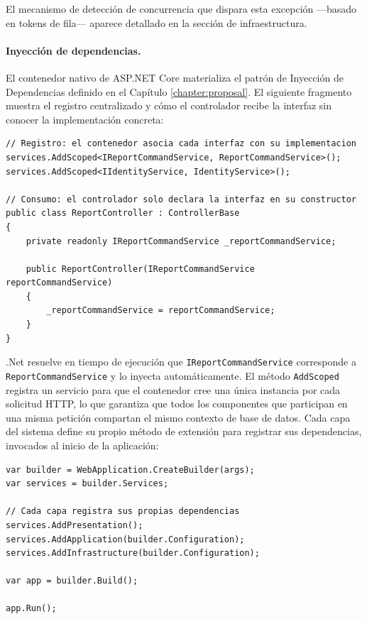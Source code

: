 El mecanismo de detección de concurrencia que dispara esta excepción —basado en tokens de fila— aparece detallado en la sección de infraestructura.



\paragraph{Inyección de dependencias.}

El contenedor nativo de ASP.NET Core materializa el patrón de Inyección de Dependencias definido en el Capítulo \ref{chapter:proposal}.
El siguiente fragmento muestra el registro centralizado y cómo el controlador recibe la interfaz sin conocer la implementación concreta:

\begin{lstlisting}[language={[Sharp]C}, caption={Registro y consumo de dependencias}, label={lst:di_registration}]
// Registro: el contenedor asocia cada interfaz con su implementacion
services.AddScoped<IReportCommandService, ReportCommandService>();
services.AddScoped<IIdentityService, IdentityService>();

// Consumo: el controlador solo declara la interfaz en su constructor
public class ReportController : ControllerBase
{
    private readonly IReportCommandService _reportCommandService;

    public ReportController(IReportCommandService reportCommandService)
    {
        _reportCommandService = reportCommandService;
    }
}
\end{lstlisting}

.Net resuelve en tiempo de ejecución que \texttt{IReportCommandService} corresponde a \texttt{ReportCommandService} y lo inyecta automáticamente.
El método \texttt{AddScoped} registra un servicio para que el contenedor cree una única instancia por cada solicitud HTTP, lo que garantiza que todos los componentes que participan en una misma petición compartan el mismo contexto de base de datos. 
Cada capa del sistema define su propio método de extensión para registrar sus dependencias, invocados al inicio de la aplicación:

\begin{lstlisting}[language={[Sharp]C}, caption={Invocación de los métodos de registro en Program.cs}, label={lst:program}]
var builder = WebApplication.CreateBuilder(args);
var services = builder.Services;

// Cada capa registra sus propias dependencias
services.AddPresentation();
services.AddApplication(builder.Configuration);
services.AddInfrastructure(builder.Configuration);

var app = builder.Build();

app.Run();

\end{lstlisting}




